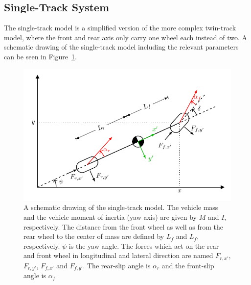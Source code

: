 \documentclass[letterpaper, 10 pt, conference]{ieeeconf}  %
\begin{document}
\subsection{Single-Track System}
The single-track model is a simplified version of the more complex twin-track model, where the front and rear axis only carry one wheel each instead of two.
A schematic drawing of the single-track model including the relevant parameters can be seen in Figure~\ref{fig:singletrack}.
\begin{figure}
  \includegraphics[width=\linewidth]{tikz_singletrack.pdf}
  \caption{A schematic drawing of the single-track model. The vehicle mass and the vehicle moment of inertia (yaw axis) are given by $M$ and $I$, respectively. The distance from the front wheel as well as from the rear wheel to the center of mass are defined by $L_f$ and $L_f$, respectively. $\psi$ is the yaw angle. The forces which act on the rear and front wheel in longitudinal and lateral direction are named $F_{r,x'}$, $F_{r,y'}$, $F_{f,x'}$ and $F_{f,y'}$. The rear-slip angle is $\alpha_r$ and the front-slip angle is $\alpha_f$ }
  \label{fig:singletrack}
\end{figure}
\end{document}
